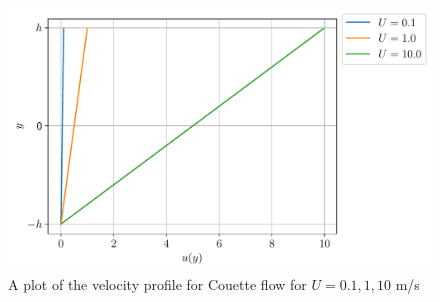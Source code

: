 \begin{figure}[H]
    \centering
    \includegraphics[scale=0.75]{figures/couette_velocity-profile.pdf}
    \caption{A plot of the velocity profile for Couette flow for $U = 0.1, 1, 10$ m/s}
\end{figure}